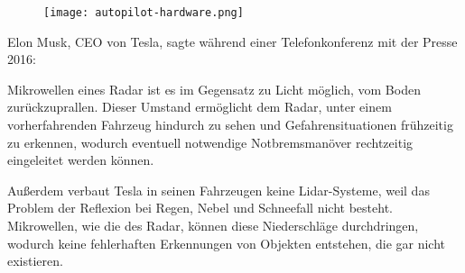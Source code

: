 \begin{figure}\centering
  \texttt{[image: autopilot-hardware.png]}
  \label{autopilot-hardware}
\end{figure}

\noindent Elon Musk, CEO von Tesla, sagte während einer Telefonkonferenz mit der Presse 2016: 

Mikrowellen eines \acs{Radar} ist es im Gegensatz zu Licht möglich, vom Boden zurückzuprallen. Dieser Umstand ermöglicht dem \acs{Radar}, unter einem vorherfahrenden Fahrzeug hindurch zu sehen und Gefahrensituationen frühzeitig zu erkennen, wodurch eventuell notwendige Notbremsmanöver rechtzeitig eingeleitet werden können. 

Außerdem verbaut Tesla in seinen Fahrzeugen keine \acs{Lidar}-Systeme, weil das Problem der Reflexion bei Regen, Nebel und Schneefall nicht besteht. Mikrowellen, wie die des \acs{Radar}, können diese Niederschläge durchdringen, wodurch keine fehlerhaften Erkennungen von Objekten entstehen, die gar nicht existieren. 
